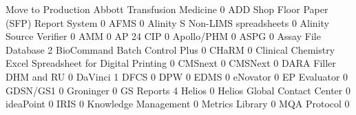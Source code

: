 \documentclass{article}
\begin{document}
\begin{Schunk}
\begin{Soutput}
                                                            Move to Production
  Abbott Transfusion Medicine                                                0
  ADD Shop Floor Paper (SFP) Report System                                   0
  AFMS                                                                       0
  Alinity S Non-LIMS spreadsheets                                            0
  Alinity Source Verifier                                                    0
  AMM                                                                        0
  AP 24 CIP                                                                  0
  Apollo/PHM                                                                 0
  ASPG                                                                       0
  Assay File Database                                                        2
  BioCommand Batch Control Plus                                              0
  CHaRM                                                                      0
  Clinical Chemistry Excel Spreadsheet for Digital Printing                  0
  CMSnext                                                                    0
  CMSNext                                                                    0
  DARA Filler DHM and RU                                                     0
  DaVinci                                                                    1
  DFCS                                                                       0
  DPW                                                                        0
  EDMS                                                                       0
  eNovator                                                                   0
  EP Evaluator                                                               0
  GDSN/GS1                                                                   0
  Groninger                                                                  0
  GS Reports                                                                 4
  Helios                                                                     0
  Helios Global Contact Center                                               0
  ideaPoint                                                                  0
  IRIS                                                                       0
  Knowledge Management                                                       0
  Metrics Library                                                            0
  MQA Protocol                                                               0

\end{Soutput}
\end{Schunk}
\end{document}
